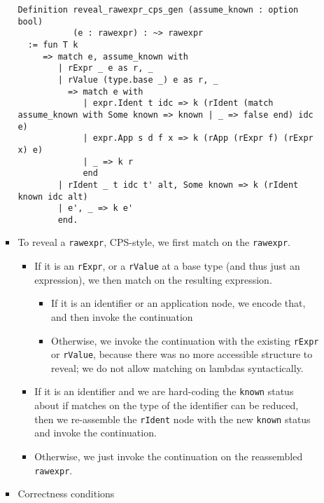 \documentclass[
]{article}
\providecommand{\tightlist}{%
  \setlength{\itemsep}{0pt}\setlength{\parskip}{0pt}}
\begin{document}
\begin{itemize}
\begin{itemize}
\begin{itemize}
\begin{verbatim}
Definition reveal_rawexpr_cps_gen (assume_known : option bool)
           (e : rawexpr) : ~> rawexpr
  := fun T k
     => match e, assume_known with
        | rExpr _ e as r, _
        | rValue (type.base _) e as r, _
          => match e with
             | expr.Ident t idc => k (rIdent (match assume_known with Some known => known | _ => false end) idc e)
             | expr.App s d f x => k (rApp (rExpr f) (rExpr x) e)
             | _ => k r
             end
        | rIdent _ t idc t' alt, Some known => k (rIdent known idc alt)
        | e', _ => k e'
        end.
\end{verbatim}
    \item
      To reveal a \texttt{rawexpr}, CPS-style, we first match on the
      \texttt{rawexpr}.

      \begin{itemize}
      \tightlist
      \item
        If it is an \texttt{rExpr}, or a \texttt{rValue} at a base type
        (and thus just an expression), we then match on the resulting
        expression.

        \begin{itemize}
        \tightlist
        \item
          If it is an identifier or an application node, we encode that,
          and then invoke the continuation
        \item
          Otherwise, we invoke the continuation with the existing
          \texttt{rExpr} or \texttt{rValue}, because there was no more
          accessible structure to reveal; we do not allow matching on
          lambdas syntactically.
        \end{itemize}
      \item
        If it is an identifier and we are hard-coding the \texttt{known}
        status about if matches on the type of the identifier can be
        reduced, then we re-assemble the \texttt{rIdent} node with the
        new \texttt{known} status and invoke the continuation.
      \item
        Otherwise, we just invoke the continuation on the reassembled
        \texttt{rawexpr}.
      \end{itemize}
    \item
      Correctness conditions


\end{itemize}
\end{itemize}
\end{itemize}
\end{document}
